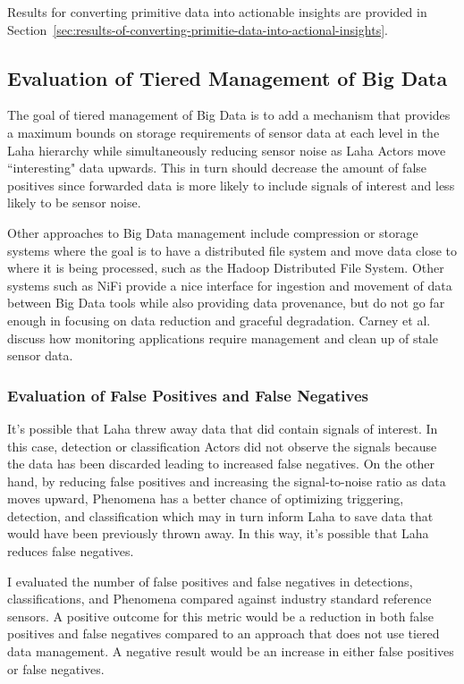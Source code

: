 Results for converting primitive data into actionable insights are provided in Section~\ref{sec:results-of-converting-primitie-data-into-actional-insights}.

\subsection{Evaluation of Tiered Management of Big Data}\label{subsec:eval-big-data}
The goal of tiered management of Big Data is to add a mechanism that provides a maximum bounds on storage requirements of sensor data at each level in the Laha hierarchy while simultaneously reducing sensor noise as Laha Actors move ``interesting" data upwards. This in turn should decrease the amount of false positives since forwarded data is more likely to include signals of interest and less likely to be sensor noise.

Other approaches to Big Data management include compression\cite{tang2004compression} or storage systems where the goal is to have a distributed file system and move data close to where it is being processed, such as the Hadoop Distributed File System\cite{warrier2007much}. Other systems such as NiFi\cite{hughes2016survey} provide a nice interface for ingestion and movement of data between Big Data tools while also providing data provenance, but do not go far enough in focusing on data reduction and graceful degradation. Carney et al.\cite{carney2002monitoring} discuss how monitoring applications require management and clean up of stale sensor data.

\subsubsection{Evaluation of False Positives and False Negatives}\label{eval-fp-fn}
It's possible that Laha threw away data that did contain signals of interest. In this case, detection or classification Actors did not observe the signals because the data has been discarded leading to increased false negatives. On the other hand, by reducing false positives and increasing the signal-to-noise ratio as data moves upward, Phenomena has a better chance of optimizing triggering, detection, and classification which may in turn inform Laha to save data that would have been previously thrown away. In this way, it's possible that Laha reduces false negatives.

I evaluated the number of false positives and false negatives in detections, classifications, and Phenomena compared against industry standard reference sensors. A positive outcome for this metric would be a reduction in both false positives and false negatives compared to an approach that does not use tiered data management. A negative result would be an increase in either false positives or false negatives.


